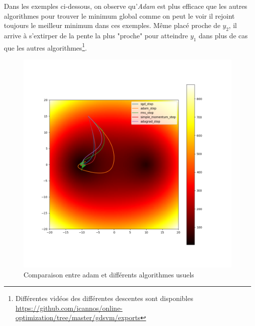 \documentclass[fleqn,11pt, titlepage, french]{article}
\begin{document}
	Dans les exemples ci-dessous, on observe qu'\emph{Adam} est plus efficace que les autres algorithmes pour trouver le minimum global comme on peut le voir il rejoint toujours le meilleur minimum dans ces exemples. Même placé proche de $y_2$, il arrive à s'extirper de la pente la plus "proche" pour atteindre $y_1$ dans plus de cas que les autres algorithmes\footnote{Différentes vidéos des différentes descentes sont disponibles \url{https://github.com/icannos/online-optimization/tree/master/gdsvm/exports}}.
	
	\begin{figure}[H]
		\centering
		\includegraphics[scale=0.3]{../gdsvm/exports/adam-rms-sgd.png}
		\caption{Comparaison entre adam et différents algorithmes usuels}
	\end{figure}
\end{document}
